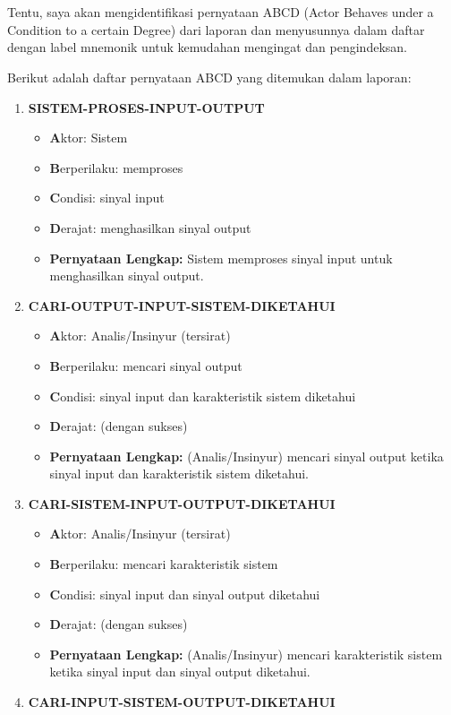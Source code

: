 \documentclass[
  letterpaper,
  DIV=11,
  numbers=noendperiod]{scrreprt}
\begin{document}

\chapter{}\label{section}

Tentu, saya akan mengidentifikasi pernyataan ABCD (Actor Behaves under a
Condition to a certain Degree) dari laporan dan menyusunnya dalam daftar
dengan label mnemonik untuk kemudahan mengingat dan pengindeksan.

Berikut adalah daftar pernyataan ABCD yang ditemukan dalam laporan:

\begin{enumerate}
\def\labelenumi{\arabic{enumi}.}
\item
  \textbf{SISTEM-PROSES-INPUT-OUTPUT}

  \begin{itemize}
  \item
    \textbf{A}ktor: Sistem
  \item
    \textbf{B}erperilaku: memproses
  \item
    \textbf{C}ondisi: sinyal input
  \item
    \textbf{D}erajat: menghasilkan sinyal output
  \item
    \textbf{Pernyataan Lengkap:} Sistem memproses sinyal input untuk
    menghasilkan sinyal output.
  \end{itemize}
\item
  \textbf{CARI-OUTPUT-INPUT-SISTEM-DIKETAHUI}

  \begin{itemize}
  \item
    \textbf{A}ktor: Analis/Insinyur (tersirat)
  \item
    \textbf{B}erperilaku: mencari sinyal output
  \item
    \textbf{C}ondisi: sinyal input dan karakteristik sistem diketahui
  \item
    \textbf{D}erajat: (dengan sukses)
  \item
    \textbf{Pernyataan Lengkap:} (Analis/Insinyur) mencari sinyal output
    ketika sinyal input dan karakteristik sistem diketahui.
  \end{itemize}
\item
  \textbf{CARI-SISTEM-INPUT-OUTPUT-DIKETAHUI}

  \begin{itemize}
  \item
    \textbf{A}ktor: Analis/Insinyur (tersirat)
  \item
    \textbf{B}erperilaku: mencari karakteristik sistem
  \item
    \textbf{C}ondisi: sinyal input dan sinyal output diketahui
  \item
    \textbf{D}erajat: (dengan sukses)
  \item
    \textbf{Pernyataan Lengkap:} (Analis/Insinyur) mencari karakteristik
    sistem ketika sinyal input dan sinyal output diketahui.
  \end{itemize}
\item
  \textbf{CARI-INPUT-SISTEM-OUTPUT-DIKETAHUI}


\end{enumerate}
\end{document}
